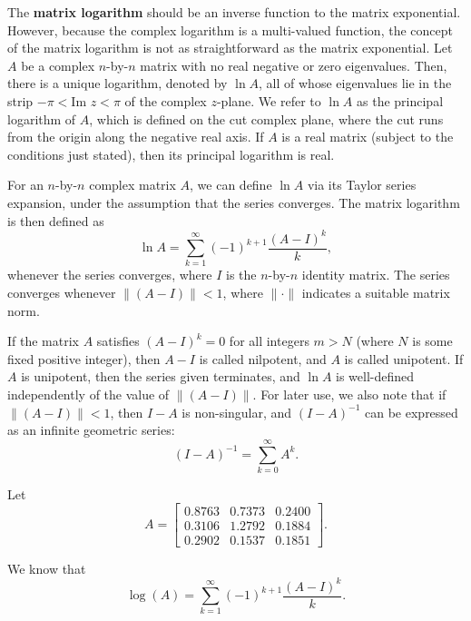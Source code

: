 \begin{definition}
\begin{example}
\end{example}


\begin{definition}

The \textbf{matrix logarithm} should be an inverse function to the matrix exponential. However, because the complex logarithm is a multi-valued function, the concept of the matrix logarithm is not as straightforward as the matrix exponential. Let \(A\) be a complex $n$-by-$n$ matrix with no real negative or zero eigenvalues. Then, there is a unique logarithm, denoted by \(\ln A\), all of whose eigenvalues lie in the strip \(-\pi < \text{Im } z < \pi\) of the complex \(z\)-plane. We refer to \(\ln A\) as the principal logarithm of \(A\), which is defined on the cut complex plane, where the cut runs from the origin along the negative real axis. If \(A\) is a real matrix (subject to the conditions just stated), then its principal logarithm is real.

For an $n$-by-$n$ complex matrix \(A\), we can define \(\ln A\) via its Taylor series expansion, under the assumption that the series converges. The matrix logarithm is then defined as
\[
\ln A = \sum_{k=1}^{\infty} (-1)^{k+1} \frac{(A - I)^k}{k},
\]
whenever the series converges, where \(I\) is the $n$-by-$n$ identity matrix. The series converges whenever \(\|(A - I)\| < 1\), where \(\|\cdot\| \) indicates a suitable matrix norm.

If the matrix \(A\) satisfies \((A - I)^k = 0\) for all integers \(m > N\) (where \(N\) is some fixed positive integer), then \(A - I\) is called nilpotent, and \(A\) is called unipotent. If \(A\) is unipotent, then the series given terminates, and \(\ln A\) is well-defined independently of the value of \(\|(A - I)\|\). For later use, we also note that if \(\|(A - I)\| < 1\), then \(I - A\) is non-singular, and \((I - A)^{-1}\) can be expressed as an infinite geometric series:
\[
(I - A)^{-1} = \sum_{k=0}^{\infty} A^k.
\]

\end{definition}




\begin{example}
\label{1.7.}
Let
\[
A = \begin{bmatrix}
    0.8763 & 0.7373 & 0.2400 \\
    0.3106 & 1.2792 & 0.1884 \\
    0.2902 & 0.1537 & 0.1851
\end{bmatrix}
.\]

We know that
\[
\log(A) = \sum_{k=1}^{\infty} (-1)^{k+1} \frac{(A-I)^k}{k}
.\]



\end{example}
\end{definition}
